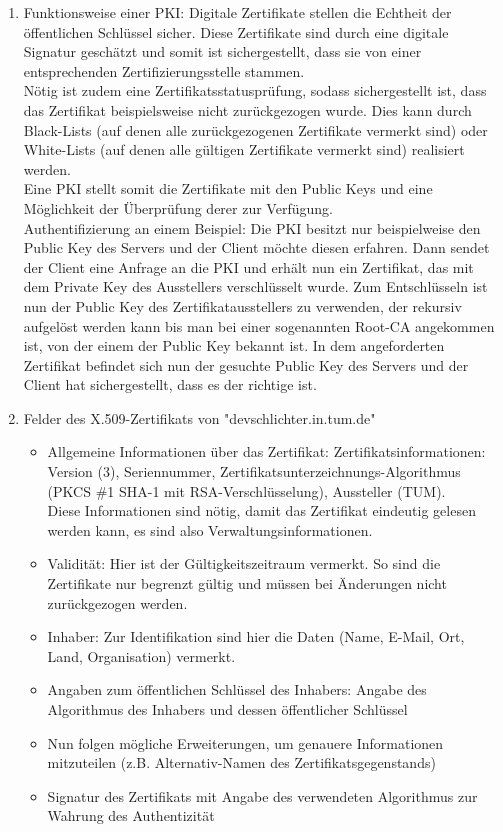 \documentclass[a4paper]{scrartcl}
\begin{document}
\begin{enumerate}[label=\alph*)]
\item Funktionsweise einer PKI: Digitale Zertifikate stellen die Echtheit der öffentlichen Schlüssel sicher. Diese Zertifikate sind durch eine digitale Signatur geschätzt und somit ist sichergestellt, dass sie von einer entsprechenden Zertifizierungsstelle stammen. \\
Nötig ist zudem eine Zertifikatsstatusprüfung, sodass sichergestellt ist, dass das Zertifikat beispielsweise nicht zurückgezogen wurde. Dies kann durch Black-Lists (auf denen alle zurückgezogenen Zertifikate vermerkt sind) oder White-Lists (auf denen alle gültigen Zertifikate vermerkt sind) realisiert werden. \\
Eine PKI stellt somit die Zertifikate mit den Public Keys und eine Möglichkeit der Überprüfung derer zur Verfügung. 
\\
Authentifizierung an einem Beispiel: Die PKI besitzt nur beispielweise den Public Key des Servers und der Client möchte diesen erfahren. Dann sendet der Client eine Anfrage an die PKI und erhält nun ein Zertifikat, das mit dem Private Key des Ausstellers verschlüsselt wurde. Zum Entschlüsseln ist nun der Public Key des Zertifikatausstellers zu verwenden, der rekursiv aufgelöst werden kann bis man bei einer sogenannten Root-CA angekommen ist, von der einem der Public Key bekannt ist. In dem angeforderten Zertifikat befindet sich nun der gesuchte Public Key des Servers und der Client hat sichergestellt, dass es der richtige ist. 

\item Felder des X.509-Zertifikats von "devschlichter.in.tum.de"
\begin{itemize}
\item Allgemeine Informationen über das Zertifikat: Zertifikatsinformationen: Version (3), Seriennummer, Zertifikatsunterzeichnungs-Algorithmus (PKCS \#1 SHA-1 mit RSA-Verschlüsselung), Aussteller (TUM).\\
Diese Informationen sind nötig, damit das Zertifikat eindeutig gelesen werden kann, es sind also Verwaltungsinformationen.
\item Validität: Hier ist der Gültigkeitszeitraum vermerkt. So sind die Zertifikate nur begrenzt gültig und müssen bei Änderungen nicht zurückgezogen werden.
\item Inhaber: Zur Identifikation sind hier die Daten (Name, E-Mail, Ort, Land, Organisation) vermerkt.
\item Angaben zum öffentlichen Schlüssel des Inhabers: Angabe des Algorithmus des Inhabers und dessen öffentlicher Schlüssel
\item Nun folgen mögliche Erweiterungen, um genauere Informationen mitzuteilen (z.B. Alternativ-Namen des Zertifikatsgegenstands)
\item Signatur des Zertifikats mit Angabe des verwendeten Algorithmus zur Wahrung des Authentizität
\end{itemize}


\end{enumerate}
\end{document}
